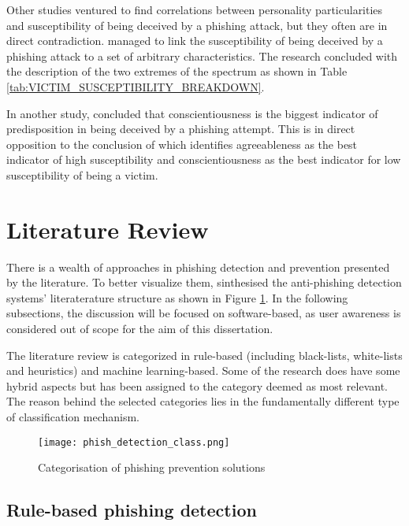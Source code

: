 Other studies ventured to find correlations between personality particularities and
susceptibility of being deceived by a phishing attack, but they often are in
direct contradiction. \cite{UNDERSTANDING_PHISHING_VICTIM} managed to link the
susceptibility of being deceived by a phishing attack to a set of arbitrary
characteristics. The research concluded with the description of the two extremes
of the spectrum as shown in Table \ref{tab:VICTIM_SUSCEPTIBILITY_BREAKDOWN}.

In another study, \cite{SPEARPHISHING_IN_THE_WILD} concluded that
conscientiousness is the biggest indicator of predisposition in being deceived
by a phishing attempt. This is in direct opposition to the conclusion of
\cite{UNDERSTANDING_PHISHING_VICTIM} which identifies agreeableness as the best
indicator of high susceptibility and conscientiousness as the best indicator for
low susceptibility of being a victim.


\section{Literature Review}
There is a wealth of approaches in phishing detection and prevention presented
by the literature. To better visualize them, \cite{ML_BASED_DETECTION_FROM_URL}
sinthesised the anti-phishing detection systems' literaterature structure as shown in Figure \ref{fig:PHISHING_SOLUTION_CATEGS}. In the following subsections, the discussion will be focused on software-based, as user awareness is considered out of scope for the aim of this dissertation.

The literature review is categorized in rule-based (including black-lists, white-lists and heuristics) and machine learning-based. Some of the research does have
some hybrid aspects but has been assigned to the category deemed as most
relevant. The reason behind the selected categories lies in the fundamentally
different type of classification mechanism.

\begin{figure}[t]
	\centering
	\texttt{[image: phish\_detection\_class.png]}
	\caption{
		Categorisation of phishing prevention solutions
		\citep{ML_BASED_DETECTION_FROM_URL}}
	\label{fig:PHISHING_SOLUTION_CATEGS}
\end{figure}

\subsection{Rule-based phishing detection}
\label{RULEBASED}

